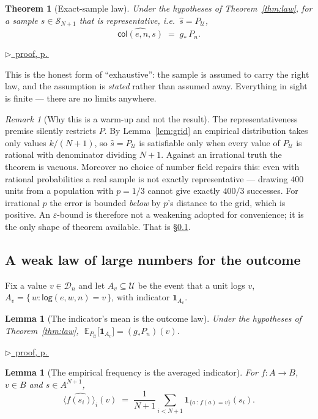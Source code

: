 \documentclass[11pt,a4paper]{article}
\theoremstyle{definition}
\theoremstyle{plain}
\newtheorem{theorem}[definition]{Theorem}
\newtheorem{lemma}[definition]{Lemma}
\theoremstyle{remark}
\newtheorem{remark}[definition]{Remark}
\newcommand{\dom}{\mathcal{D}}
\newcommand{\Ctx}{\mathcal{U}}         %
\newcommand{\push}[1]{{#1}_{*}}        %
\newcommand{\Smp}{\mathcal{S}}         %
\newcommand{\emp}[1]{\widehat{#1}}
\newcommand{\logv}{\mathsf{log}}
\newcommand{\Ind}[1]{\mathbf{1}_{#1}}
\newcommand{\Ex}{\mathbb{E}}
\newcommand{\pfref}[1]{%
  \par\smallskip\noindent
  \hyperref[pf:#1]{\small$\triangleright$\ proof, p.\,\pageref{pf:#1}}\par\smallskip}
\begin{document}
\begin{theorem}[Exact-sample law]
\label{thm:exact}
Under the hypotheses of Theorem~\ref{thm:law}, for a sample
$s \in \Smp_{N+1}$ that is \emph{representative}, i.e.\
$\emp{s} = P_\Ctx$,
\[
  \emp{\mathsf{col}(e,n,s)} \;=\; \push{g}\, P_n .
\]
\end{theorem}

\pfref{thm:exact}

This is the honest form of ``exhaustive'': the sample is assumed to carry
the right law, and the assumption is \emph{stated} rather than assumed
away. Everything in sight is finite --- there are no limits anywhere.

\begin{remark}[Why this is a warm-up and not the result]
\label{rem:warmup}
The representativeness premise silently restricts $P$. By
Lemma~\ref{lem:grid} an empirical distribution takes only values
$k/(N+1)$, so $\emp{s} = P_\Ctx$ is satisfiable only when every value of
$P_\Ctx$ is rational with denominator dividing $N+1$. Against an
irrational truth the theorem is vacuous. Moreover no choice of number
field repairs this: even with rational probabilities a real sample is not
exactly representative --- drawing $400$ units from a population with
$p = 1/3$ cannot give exactly $400/3$ successes. For irrational $p$ the
error is bounded \emph{below} by $p$'s distance to the grid, which is
positive. An $\varepsilon$-bound is therefore not a weakening adopted for
convenience; it is the only shape of theorem available. That is
\S\ref{sec:lln}.
\end{remark}

\subsection{A weak law of large numbers for the outcome}
\label{sec:lln}

Fix a value $v \in \dom_n$ and let $A_v \subseteq \Ctx$ be the event that a
unit logs $v$,
$A_v = \{\,w : \logv(e,w,n) = v\,\}$, with indicator $\Ind{A_v}$.

\begin{lemma}[The indicator's mean is the outcome law]
\label{lem:eind}
Under the hypotheses of Theorem~\ref{thm:law},
$\;\Ex_{P_\Ctx}\bigl[\Ind{A_v}\bigr] = (\push{g}P_n)(v)$.
\end{lemma}

\pfref{lem:eind}

\begin{lemma}[The empirical frequency is the averaged indicator]
\label{lem:bridge}
For $f : A \to B$, $v \in B$ and $s \in A^{N+1}$,
\[
  \emp{\langle f(s_i)\rangle_i}(v)
  \;=\;
  \frac{1}{N+1}\sum_{i<N+1} \Ind{\{a\,:\,f(a)=v\}}(s_i).
\]
\end{lemma}
\end{document}
